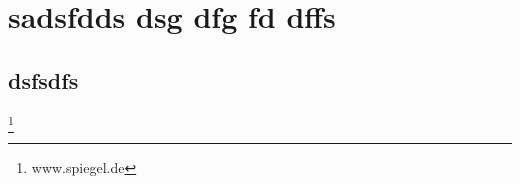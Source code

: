 \documentclass[12pt,ngerman,twocolumn]{scrreprt}
\begin{document}
\chapter{sadsfdds dsg dfg fd dffs}
\section{dsfsdfs}

\blindtext[2]\footnote{www.spiegel.de}
\blindtext[2]
\end{document}
